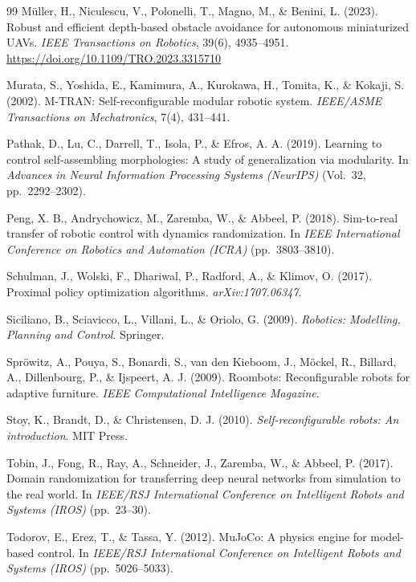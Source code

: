 \documentclass[11pt,a4paper]{article}
\begin{document}
{\begin{thebibliography}{99}
M\"uller, H., Niculescu, V., Polonelli, T., Magno, M., \& Benini, L. (2023).
Robust and efficient depth-based obstacle avoidance for autonomous miniaturized
UAVs. \textit{IEEE Transactions on Robotics}, 39(6), 4935--4951.
\url{https://doi.org/10.1109/TRO.2023.3315710}

Murata, S., Yoshida, E., Kamimura, A., Kurokawa, H., Tomita, K., \& Kokaji, S.
(2002). M-TRAN: Self-reconfigurable modular robotic system. \textit{IEEE/ASME
Transactions on Mechatronics}, 7(4), 431--441.

Pathak, D., Lu, C., Darrell, T., Isola, P., \& Efros, A. A. (2019). Learning to
control self-assembling morphologies: A study of generalization via modularity.
In \textit{Advances in Neural Information Processing Systems (NeurIPS)}
(Vol.\ 32, pp.\ 2292--2302).

Peng, X. B., Andrychowicz, M., Zaremba, W., \& Abbeel, P. (2018). Sim-to-real
transfer of robotic control with dynamics randomization. In \textit{IEEE
International Conference on Robotics and Automation (ICRA)}
(pp.\ 3803--3810).

Schulman, J., Wolski, F., Dhariwal, P., Radford, A., \& Klimov, O. (2017).
Proximal policy optimization algorithms. \textit{arXiv:1707.06347}.

Siciliano, B., Sciavicco, L., Villani, L., \& Oriolo, G. (2009).
\textit{Robotics: Modelling, Planning and Control}. Springer.

Spr\"owitz, A., Pouya, S., Bonardi, S., van den Kieboom, J., M\"ockel, R.,
Billard, A., Dillenbourg, P., \& Ijspeert, A. J. (2009). Roombots:
Reconfigurable robots for adaptive furniture. \textit{IEEE Computational
Intelligence Magazine}.

Stoy, K., Brandt, D., \& Christensen, D. J. (2010). \textit{Self-reconfigurable
robots: An introduction}. MIT Press.

Tobin, J., Fong, R., Ray, A., Schneider, J., Zaremba, W., \& Abbeel, P. (2017).
Domain randomization for transferring deep neural networks from simulation to
the real world. In \textit{IEEE/RSJ International Conference on Intelligent
Robots and Systems (IROS)} (pp.\ 23--30).

Todorov, E., Erez, T., \& Tassa, Y. (2012). MuJoCo: A physics engine for
model-based control. In \textit{IEEE/RSJ International Conference on
Intelligent Robots and Systems (IROS)} (pp.\ 5026--5033).


\end{thebibliography}}
\end{document}
